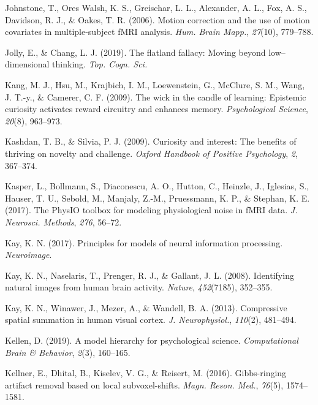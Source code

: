 \documentclass[12pt,american,a4paper,oneside,]{memoir} %
\begin{document}
\leavevmode\hypertarget{ref-Johnstone2006-tn}{}%
Johnstone, T., Ores Walsh, K. S., Greischar, L. L., Alexander, A. L., Fox, A. S., Davidson, R. J., \& Oakes, T. R. (2006). Motion correction and the use of motion covariates in multiple-subject fMRI analysis. \emph{Hum. Brain Mapp.}, \emph{27}(10), 779--788.

\leavevmode\hypertarget{ref-Jolly2019-lx}{}%
Jolly, E., \& Chang, L. J. (2019). The flatland fallacy: Moving beyond low--dimensional thinking. \emph{Top. Cogn. Sci.}

\leavevmode\hypertarget{ref-kang2009wick}{}%
Kang, M. J., Hsu, M., Krajbich, I. M., Loewenstein, G., McClure, S. M., Wang, J. T.-y., \& Camerer, C. F. (2009). The wick in the candle of learning: Epistemic curiosity activates reward circuitry and enhances memory. \emph{Psychological Science}, \emph{20}(8), 963--973.

\leavevmode\hypertarget{ref-kashdan2009curiosity}{}%
Kashdan, T. B., \& Silvia, P. J. (2009). Curiosity and interest: The benefits of thriving on novelty and challenge. \emph{Oxford Handbook of Positive Psychology}, \emph{2}, 367--374.

\leavevmode\hypertarget{ref-Kasper2017-lp}{}%
Kasper, L., Bollmann, S., Diaconescu, A. O., Hutton, C., Heinzle, J., Iglesias, S., Hauser, T. U., Sebold, M., Manjaly, Z.-M., Pruessmann, K. P., \& Stephan, K. E. (2017). The PhysIO toolbox for modeling physiological noise in fMRI data. \emph{J. Neurosci. Methods}, \emph{276}, 56--72.

\leavevmode\hypertarget{ref-Kay2017-vr}{}%
Kay, K. N. (2017). Principles for models of neural information processing. \emph{Neuroimage}.

\leavevmode\hypertarget{ref-kay2008identifying}{}%
Kay, K. N., Naselaris, T., Prenger, R. J., \& Gallant, J. L. (2008). Identifying natural images from human brain activity. \emph{Nature}, \emph{452}(7185), 352--355.

\leavevmode\hypertarget{ref-Kay2013-ch}{}%
Kay, K. N., Winawer, J., Mezer, A., \& Wandell, B. A. (2013). Compressive spatial summation in human visual cortex. \emph{J. Neurophysiol.}, \emph{110}(2), 481--494.

\leavevmode\hypertarget{ref-Kellen2019-af}{}%
Kellen, D. (2019). A model hierarchy for psychological science. \emph{Computational Brain \& Behavior}, \emph{2}(3), 160--165.

\leavevmode\hypertarget{ref-Kellner2016-xb}{}%
Kellner, E., Dhital, B., Kiselev, V. G., \& Reisert, M. (2016). Gibbs-ringing artifact removal based on local subvoxel-shifts. \emph{Magn. Reson. Med.}, \emph{76}(5), 1574--1581.
\end{document}
